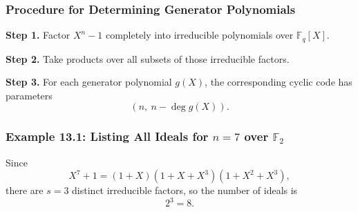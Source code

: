\documentclass[
]{article}
\begin{document}
\subsubsection{Procedure for Determining Generator
Polynomials}\label{procedure-for-determining-generator-polynomials}

\textbf{Step 1.} Factor \(X^n-1\) completely into irreducible
polynomials over \(\mathbb{F}_q[X]\).

\textbf{Step 2.} Take products over all subsets of those irreducible
factors.

\textbf{Step 3.} For each generator polynomial \(g(X)\), the
corresponding cyclic code has parameters \[(n,\ n-\deg g(X)).\]

\subsubsection{\texorpdfstring{Example 13.1: Listing All Ideals for
\(n=7\) over
\(\mathbb{F}_2\)}{Example 13.1: Listing All Ideals for n=7 over \textbackslash mathbb\{F\}\_2}}\label{example-13.1-listing-all-ideals-for-n7-over-mathbbf_2}

Since \[X^7+1=(1+X)(1+X+X^3)(1+X^2+X^3),\] there are \(s=3\) distinct
irreducible factors, so the number of ideals is \[2^3=8.\]
\end{document}
